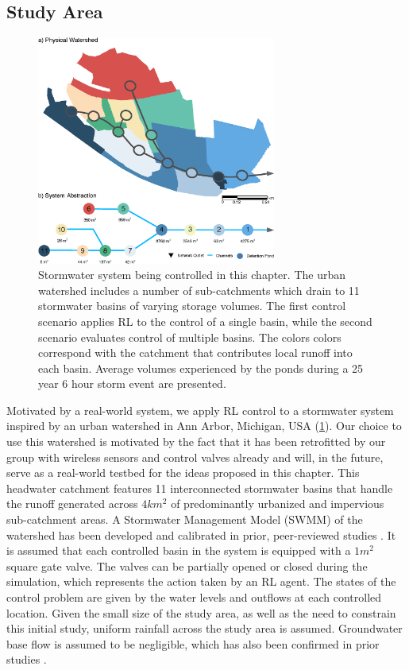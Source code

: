 \subsection{Study Area}
\begin{figure}
    \centering
    \includegraphics[width=0.7\textwidth]{gfx/Chapter-3/casestudy_fig_2.eps}
    \caption{Stormwater system being controlled in this chapter. The urban watershed includes a number of sub-catchments which drain to 11 stormwater basins of varying storage volumes. The first control scenario applies RL to the control of a single basin, while the second scenario evaluates control of multiple basins. The colors colors correspond with the catchment that contributes local runoff into each basin. Average volumes experienced by the ponds during a 25 year 6 hour storm event are presented.}\label{fig:2}
\end{figure}

Motivated by a real-world system, we apply RL control to a stormwater system inspired by an urban watershed in Ann Arbor, Michigan, USA (\ref{fig:2}). Our choice to use this watershed is motivated by the fact that it has been retrofitted by our group with wireless sensors and control valves already \cite{bartos2017open} and will, in the future, serve as a real-world testbed for the ideas proposed in this chapter. This headwater catchment features 11 interconnected stormwater basins that handle the runoff generated across $4km^2$   of predominantly urbanized and impervious sub-catchment areas.   A Stormwater Management Model (SWMM) of the watershed has been developed and calibrated in prior, peer-reviewed studies \cite{wong2018real}. It is assumed that each controlled basin in the system is equipped with a $1m^2$ square gate valve. The valves can be partially opened or closed during the simulation, which represents the action taken by an RL agent. The states of the control problem are given by the water levels and outflows at each controlled location. Given the small size of the study area, as well as the need to constrain this initial study, uniform rainfall across the study area is assumed. Groundwater base flow is assumed to be negligible, which has also been confirmed in prior studies \cite{wong2018real}.

